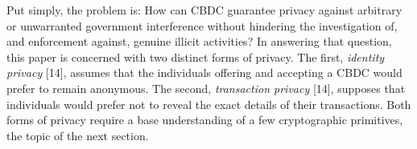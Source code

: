 Put simply, the problem is: How can CBDC guarantee privacy against arbitrary or unwarranted government interference without hindering the investigation of, and enforcement against, genuine illicit activities? In answering that question, this paper is concerned with two distinct forms of privacy. The first, \textit{identity privacy} [14], assumes that the individuals offering and accepting a CBDC would prefer to remain anonymous. The second, \textit{transaction privacy} [14], supposes that individuals would prefer not to reveal the exact details of their transactions. Both forms of privacy require a base understanding of a few cryptographic primitives, the topic of the next section.
